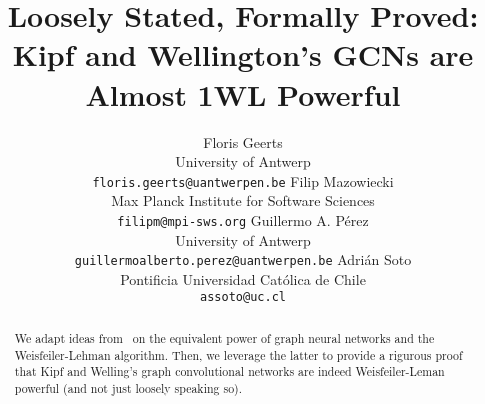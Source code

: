 \documentclass[a4paper]{article}
\title{Loosely Stated, Formally Proved: Kipf and Wellington's GCNs
are Almost 1WL Powerful}
\author{
  Floris Geerts\\
  University of Antwerp\\
  \texttt{floris.geerts@uantwerpen.be}
  \And
  Filip Mazowiecki\\
  Max Planck Institute for Software Sciences\\
  \texttt{filipm@mpi-sws.org}
  \And
  Guillermo A. P\'erez\\
  University of Antwerp\\
  \texttt{guillermoalberto.perez@uantwerpen.be}
  \And
  Adri\'an Soto\\
  Pontificia Universidad Cat\'olica de Chile\\
  \texttt{assoto@uc.cl}
}
\begin{document}
\maketitle

\begin{abstract}
  We adapt ideas from~\cite{grohewl} on the equivalent power of graph neural
  networks and the Weisfeiler-Lehman algorithm.  Then, we leverage the latter
  to provide a rigurous proof that Kipf and Welling's graph convolutional
  networks are indeed Weisfeiler-Leman powerful (and not just loosely speaking
  so).
\end{abstract}












% 

\end{document}
